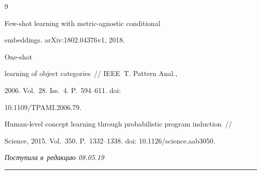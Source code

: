 {\small\frenchspacing

{%


\begin{thebibliography}{9}


     Few-shot learning with metric-agnostic conditional 

embeddings. arXiv:1802.04376v1, 2018.

       



   




     One-shot 

learning of object categories~/\!\!/ IEEE~T. Pattern Anal., 

2006. Vol.~28. Iss.~4. P.~594--611. doi: 

10.1109\!/\!TPAMI.2006.79.





    Human-level concept learning through probabilistic program induction~/\!\!/ 

Science, 2015. Vol.~350. P.~1332--1338. doi: 10.1126\!/\!science.aab3050.



        \end{thebibliography}

} }





\vspace*{-3pt}



\hfill{\small\textit{Поступила в~редакцию 08.05.19}}









\vspace*{8pt}



\hrule



